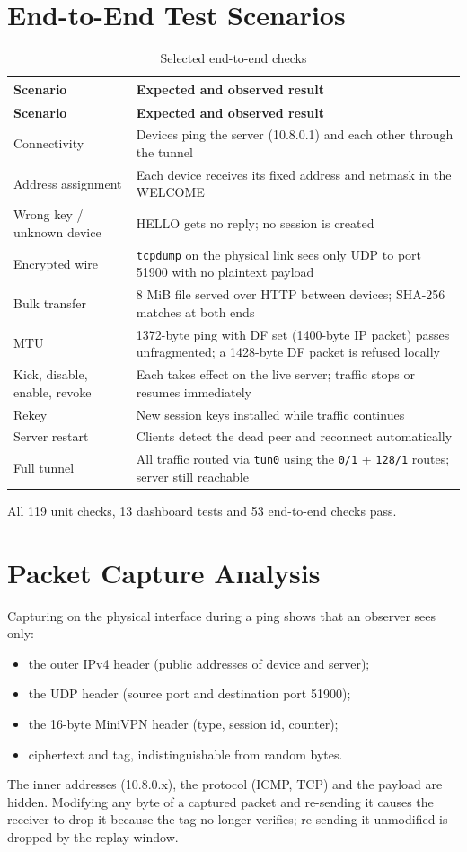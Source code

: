 \documentclass[12pt,a4paper]{report}
\begin{document}
\section{End-to-End Test Scenarios}
\begin{longtable}{@{}p{5.5cm}p{9cm}@{}}
\caption{Selected end-to-end checks}\\
\toprule
\textbf{Scenario} & \textbf{Expected and observed result}\\
\midrule
\endfirsthead
\toprule
\textbf{Scenario} & \textbf{Expected and observed result}\\
\midrule
\endhead
Connectivity & Devices ping the server (10.8.0.1) and each other through the tunnel\\
Address assignment & Each device receives its fixed address and netmask in the WELCOME\\
Wrong key / unknown device & HELLO gets no reply; no session is created\\
Encrypted wire & \texttt{tcpdump} on the physical link sees only UDP to port 51900 with no plaintext payload\\
Bulk transfer & 8 MiB file served over HTTP between devices; SHA-256 matches at both ends\\
MTU & 1372-byte ping with DF set (1400-byte IP packet) passes unfragmented; a 1428-byte DF packet is refused locally\\
Kick, disable, enable, revoke & Each takes effect on the live server; traffic stops or resumes immediately\\
Rekey & New session keys installed while traffic continues\\
Server restart & Clients detect the dead peer and reconnect automatically\\
Full tunnel & All traffic routed via \texttt{tun0} using the \texttt{0/1} + \texttt{128/1} routes; server still reachable\\
\bottomrule
\end{longtable}
All 119 unit checks, 13 dashboard tests and 53 end-to-end checks pass.

\section{Packet Capture Analysis}
Capturing on the physical interface during a ping shows that an observer sees only:
\begin{itemize}
  \item the outer IPv4 header (public addresses of device and server);
  \item the UDP header (source port and destination port 51900);
  \item the 16-byte MiniVPN header (type, session id, counter);
  \item ciphertext and tag, indistinguishable from random bytes.
\end{itemize}
The inner addresses (10.8.0.x), the protocol (ICMP, TCP) and the payload are hidden.
Modifying any byte of a captured packet and re-sending it causes the receiver to drop
it because the tag no longer verifies; re-sending it unmodified is dropped by the
replay window.
\end{document}
